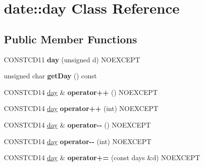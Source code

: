 \hypertarget{classdate_1_1day}{}\section{date\+::day Class Reference}
\label{classdate_1_1day}
\subsection*{Public Member Functions}
\begin{DoxyCompactItemize}
\item 
\mbox{\label{classdate_1_1day_a63d245d16920af4b432769292649d613}} 
C\+O\+N\+S\+T\+C\+D11 {\bfseries day} (unsigned d) N\+O\+E\+X\+C\+E\+PT
\item 
\mbox{\label{classdate_1_1day_aa1cc9522c2c3a1d7761c1b1e7c54f3a1}} 
unsigned char {\bfseries get\+Day} () const
\item 
\mbox{\label{classdate_1_1day_aafe96cd1e460918da89d61609000aea7}} 
C\+O\+N\+S\+T\+C\+D14 \mbox{\hyperlink{classdate_1_1day}{day}} \& {\bfseries operator++} () N\+O\+E\+X\+C\+E\+PT
\item 
\mbox{\label{classdate_1_1day_a5c7e791e42f0522857e8e3de21ef55b6}} 
C\+O\+N\+S\+T\+C\+D14 \mbox{\hyperlink{classdate_1_1day}{day}} {\bfseries operator++} (int) N\+O\+E\+X\+C\+E\+PT
\item 
\mbox{\label{classdate_1_1day_a79ebeac089e3a4360dedcc42bc184c38}} 
C\+O\+N\+S\+T\+C\+D14 \mbox{\hyperlink{classdate_1_1day}{day}} \& {\bfseries operator-\/-\/} () N\+O\+E\+X\+C\+E\+PT
\item 
\mbox{\label{classdate_1_1day_ad894b9b36123afc180545865fcc01378}} 
C\+O\+N\+S\+T\+C\+D14 \mbox{\hyperlink{classdate_1_1day}{day}} {\bfseries operator-\/-\/} (int) N\+O\+E\+X\+C\+E\+PT
\item 
\mbox{\label{classdate_1_1day_af61aa577c996cb92157dbe1b44d97ee0}} 
C\+O\+N\+S\+T\+C\+D14 \mbox{\hyperlink{classdate_1_1day}{day}} \& {\bfseries operator+=} (const days \&d) N\+O\+E\+X\+C\+E\+PT
\item 
\mbox{\label{classdate_1_1day_a22cbfad1560fc9c0e35dcb59282315f2}} 

\end{DoxyCompactItemize}
